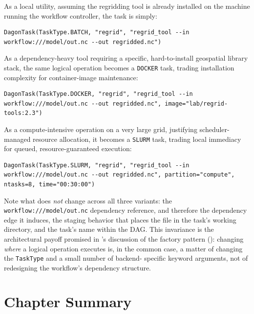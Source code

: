 As a local utility, assuming the regridding tool is already installed on the
machine running the workflow controller, the task is simply:
\begin{lstlisting}
DagonTask(TaskType.BATCH, "regrid", "regrid_tool --in workflow:///model/out.nc --out regridded.nc")
\end{lstlisting}

As a dependency-heavy tool requiring a specific, hard-to-install geospatial
library stack, the same logical operation becomes a \texttt{DOCKER} task,
trading installation complexity for container-image maintenance:
\begin{lstlisting}
DagonTask(TaskType.DOCKER, "regrid", "regrid_tool --in workflow:///model/out.nc --out regridded.nc", image="lab/regrid-tools:2.3")
\end{lstlisting}

As a compute-intensive operation on a very large grid, justifying scheduler-
managed resource allocation, it becomes a \texttt{SLURM} task, trading local
immediacy for queued, resource-guaranteed execution:
\begin{lstlisting}
DagonTask(TaskType.SLURM, "regrid", "regrid_tool --in workflow:///model/out.nc --out regridded.nc", partition="compute", ntasks=8, time="00:30:00")
\end{lstlisting}

\begin{practicebox}
Note what does \emph{not} change across all three variants: the
\texttt{workflow:///model/out.nc} dependency reference, and therefore the
dependency edge it induces, the staging behavior that places the file in the
task's working directory, and the task's name within the DAG. This
invariance is the architectural payoff promised in 's
discussion of the factory pattern ():
changing \emph{where} a logical operation executes is, in the common case, a
matter of changing the \texttt{TaskType} and a small number of backend-
specific keyword arguments, not of redesigning the workflow's dependency
structure.
\end{practicebox}

\section{Chapter Summary}


